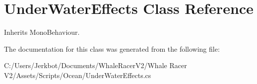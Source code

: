 \hypertarget{class_under_water_effects}{}\section{Under\+Water\+Effects Class Reference}
\label{class_under_water_effects}


Inherits Mono\+Behaviour.



The documentation for this class was generated from the following file\+:\begin{DoxyCompactItemize}
\item 
C\+:/\+Users/\+Jerkbot/\+Documents/\+Whale\+Racer\+V2/\+Whale Racer V2/\+Assets/\+Scripts/\+Ocean/Under\+Water\+Effects.\+cs\end{DoxyCompactItemize}
